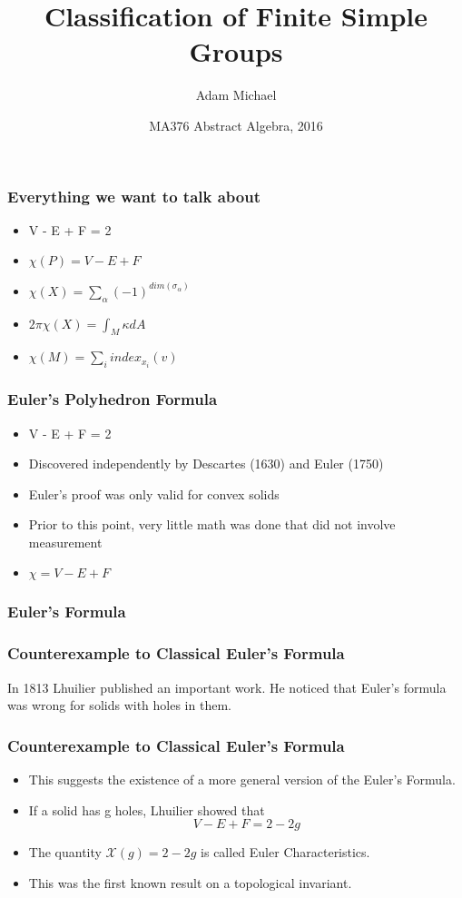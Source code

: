 \documentclass{beamer}
\title[]
{Classification of Finite Simple Groups}
\author
{Adam Michael}
\institute[Rose-Hulman]
{
  Department of Mathematics\\
  Rose-Hulman Institute of Technology
}
\date[Febuarary 22, 2016] %
{MA376 Abstract Algebra, 2016}
\begin{document}
\frame{\titlepage}

\begin{frame}
    \frametitle{Everything we want to talk about}
    \begin{itemize}
    	\item V - E + F = 2
        \item $\chi(P) = V - E + F$
        \item $\chi(X)=\sum_{\alpha}(-1)^{dim(\sigma_\alpha)}$
        \item $2\pi\chi(X) = \int_M \kappa dA$
        \item $\chi(M) = \sum_{i} index_{x_i}(v)$
    \end{itemize}
\end{frame}

\begin{frame}
	\frametitle{Euler's Polyhedron Formula}
	\begin{itemize}
		\item V - E + F = 2
		\item Discovered independently by Descartes (1630) and Euler (1750)
		\item Euler's proof was only valid for convex solids
		\item Prior to this point, very little math was done that did not involve measurement
		\item $\chi = V - E + F$
	\end{itemize}
\end{frame}

\begin{frame}
	\frametitle{Euler's Formula}
\end{frame}

\begin{frame}
    \frametitle{Counterexample to Classical Euler's Formula}
    In 1813 Lhuilier published an important work. He noticed that Euler's formula was wrong for solids with holes in them.
\end{frame}

\begin{frame}
	\frametitle{Counterexample to Classical Euler's Formula}
	\begin{itemize}[<+->]
		\item This suggests the existence of a more general version of the Euler's Formula.
		\item If a solid has g holes, Lhuilier showed that
		\[
		    V - E + F = 2 - 2g
		\]
		\item The quantity $\mathcal{X}(g) = 2 - 2g$ is called Euler Characteristics.
		\item This was the first known result on a topological invariant.
	\end{itemize}
\end{frame}
\end{document}
